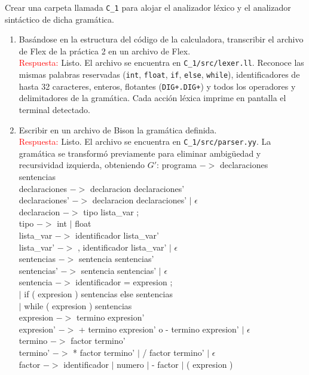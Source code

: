 \documentclass[11pt]{report}
\begin{document}
\begin{enumerate}
  Crear una carpeta llamada \texttt{C\_1} para alojar el analizador léxico y el
  analizador sintáctico de dicha gramática. \\

    \begin{enumerate}[label=\alph*.]

      \item Basándose en la estructura del código de la calculadora, transcribir el
      archivo de Flex de la práctica 2 en un archivo de Flex. \\
      \textcolor{red}{Respuesta:} Listo. El archivo se encuentra en
      \texttt{C\_1/src/lexer.ll}. Reconoce las mismas palabras reservadas
      (\texttt{int}, \texttt{float}, \texttt{if}, \texttt{else}, \texttt{while}),
      identificadores de hasta 32 caracteres, enteros, flotantes
      (\texttt{DIG+.DIG+}) y todos los operadores y delimitadores de la gramática.
      Cada acción léxica imprime en pantalla el terminal detectado.

      \item Escribir en un archivo de Bison la gramática definida. \\
      \textcolor{red}{Respuesta:} Listo. El archivo se encuentra en
      \texttt{C\_1/src/parser.yy}. La gramática se transformó previamente para
      eliminar ambigüedad y recursividad izquierda, obteniendo $G'$:
programa       $->$ declaraciones sentencias \\
declaraciones  $->$ declaracion declaraciones' \\
declaraciones' $->$ declaracion declaraciones' $|$ $\epsilon$ \\
declaracion    $->$ tipo lista\_var ; \\
tipo           $->$ int $|$ float \\
lista\_var      $->$ identificador lista\_var' \\
lista\_var'     $->$ , identificador lista\_var' $|$ $\epsilon$ \\
sentencias     $->$ sentencia sentencias' \\
sentencias'    $->$ sentencia sentencias' $|$ $\epsilon$ \\
sentencia      $->$ identificador = expresion ; \\
               $|$ if ( expresion ) { sentencias } else { sentencias } \\
               $|$ while ( expresion ) { sentencias } \\
expresion      $->$ termino expresion' \\
expresion'     $->$ + termino expresion' o - termino expresion' $|$ $\epsilon$ \\
termino        $->$ factor termino' \\
termino'       $->$ * factor termino' $|$ / factor termino' $|$ $\epsilon$ \\
factor         $->$ identificador $|$ numero $|$ - factor $|$ ( expresion ) \\


\end{enumerate}
\end{enumerate}
\end{document}
